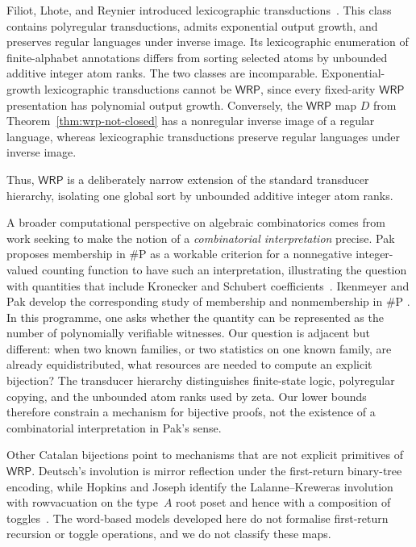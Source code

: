 \documentclass[11pt]{article}
\theoremstyle{definition}
\newcommand{\WRP}{\mathsf{WRP}}
\begin{document}
Filiot, Lhote, and Reynier introduced lexicographic
transductions~\cite{FiliotLhoteReynier2025}.  This class contains polyregular
transductions, admits exponential output growth, and preserves regular
languages under inverse image.  Its
lexicographic enumeration of finite-alphabet annotations differs from sorting
selected atoms by unbounded additive integer atom ranks.  The two classes are
incomparable.  Exponential-growth lexicographic transductions cannot be
$\WRP$, since every fixed-arity $\WRP$ presentation has polynomial output
growth.  Conversely, the $\WRP$ map $D$ from
Theorem~\ref{thm:wrp-not-closed} has a nonregular inverse image of a regular
language, whereas lexicographic transductions preserve regular languages
under inverse image.

Thus, $\WRP$ is a deliberately narrow extension of the standard transducer
hierarchy, isolating one global sort by unbounded additive integer atom ranks.

A broader computational perspective on algebraic combinatorics comes from
work seeking to make the notion of a \emph{combinatorial interpretation}
precise.  Pak proposes membership in $\#\mathrm{P}$ as a workable criterion for
a nonnegative integer-valued counting function to have such an interpretation,
illustrating the question with quantities that include Kronecker and Schubert
coefficients~\cite{Pak2024WhatIs}.  Ikenmeyer and Pak develop the corresponding
study of membership and nonmembership in $\#\mathrm{P}$
\cite{IkenmeyerPak2022}.  In this programme, one asks whether the quantity can
be represented as the number of polynomially verifiable witnesses.  Our
question is adjacent but different: when two known families, or two statistics
on one known family, are already equidistributed, what resources are needed to
compute an explicit bijection?  The transducer hierarchy distinguishes
finite-state logic, polyregular copying, and the unbounded atom ranks used by
zeta.  Our lower bounds therefore constrain a mechanism for bijective proofs,
not the existence of a combinatorial interpretation in Pak's sense.

Other Catalan bijections point to mechanisms that are not explicit primitives
of $\WRP$.  Deutsch's involution is mirror reflection under the first-return
binary-tree encoding, while Hopkins and Joseph identify the
Lalanne--Kreweras involution with rowvacuation on the type~$A$ root poset and
hence with a composition of toggles~\cite{Deutsch1999,HopkinsJoseph2022}.  The
word-based models developed here do not formalise first-return recursion or
toggle operations, and we do not classify these maps.
\end{document}
